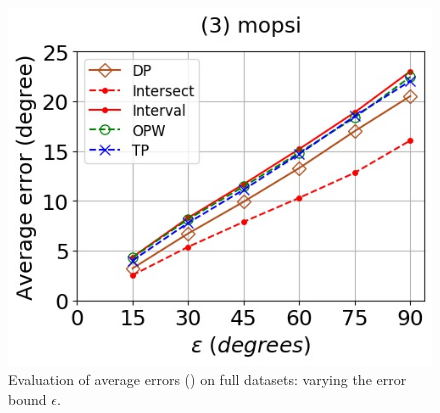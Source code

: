 \begin{figure}[tb!]
	\includegraphics[scale=0.3480]{Figures/Exp-DAD-error-epsilon-mopsi.jpg}	
	\vspace{-2ex}
	\caption{\small Evaluation of average errors (\dad) on full datasets: varying the error bound $\epsilon$.}
	\label{fig:ae-dad-epsilon}
	\vspace{-2ex}
\end{figure}




